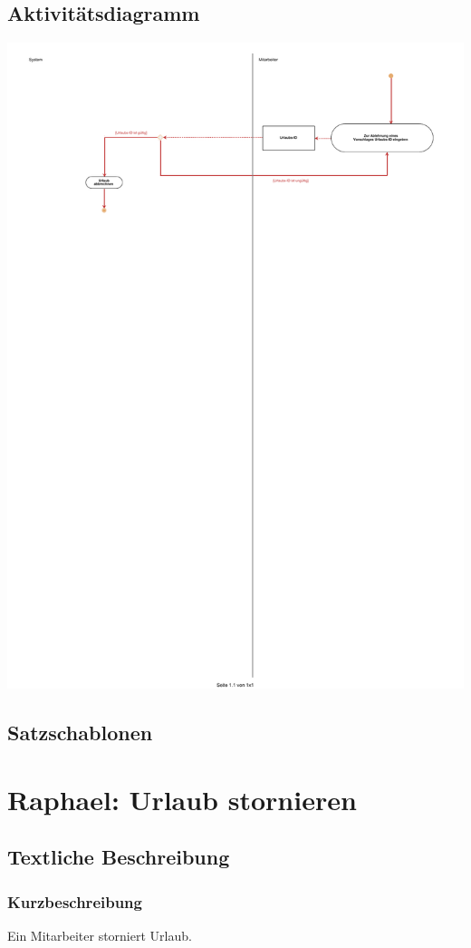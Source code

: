 \subsection{Aktivitätsdiagramm}

\begin{center}
\includegraphics[width=0.9\linewidth]{Urlaubsvorschlag_ablehnen.pdf}
\end{center}

\subsection{Satzschablonen}

\section{Raphael: Urlaub stornieren}
\subsection{Textliche Beschreibung}
\subsubsection{Kurzbeschreibung}
Ein Mitarbeiter storniert Urlaub.
